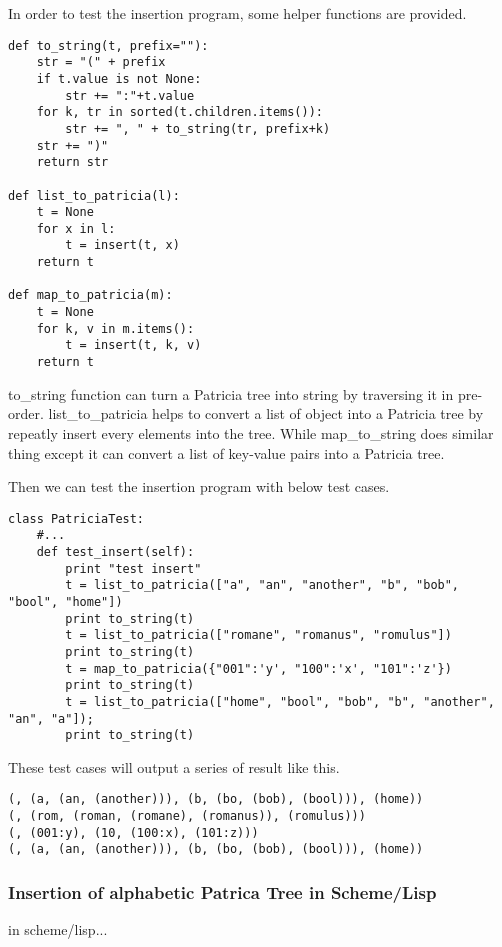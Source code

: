 \documentclass{article}
\begin{document}
In order to test the insertion program, some helper functions are
provided.

\begin{lstlisting}
def to_string(t, prefix=""):
    str = "(" + prefix
    if t.value is not None:
        str += ":"+t.value
    for k, tr in sorted(t.children.items()):
        str += ", " + to_string(tr, prefix+k)
    str += ")"
    return str

def list_to_patricia(l):
    t = None
    for x in l:
        t = insert(t, x)
    return t

def map_to_patricia(m):
    t = None
    for k, v in m.items():
        t = insert(t, k, v)
    return t
\end{lstlisting}

to\_string function can turn a Patricia tree into string by traversing it
in pre-order. list\_to\_patricia helps to convert a list of object into
a Patricia tree by repeatly insert every elements into the tree. While 
map\_to\_string does similar thing except it can convert a list of key-value
pairs into a Patricia tree.

Then we can test the insertion program with below test cases.

\begin{lstlisting}
class PatriciaTest:
    #...
    def test_insert(self):
        print "test insert"
        t = list_to_patricia(["a", "an", "another", "b", "bob", "bool", "home"])
        print to_string(t)
        t = list_to_patricia(["romane", "romanus", "romulus"])
        print to_string(t)
        t = map_to_patricia({"001":'y', "100":'x', "101":'z'})
        print to_string(t)
        t = list_to_patricia(["home", "bool", "bob", "b", "another", "an", "a"]);
        print to_string(t)
\end{lstlisting}

These test cases will output a series of result like this.

\begin{verbatim}
(, (a, (an, (another))), (b, (bo, (bob), (bool))), (home))
(, (rom, (roman, (romane), (romanus)), (romulus)))
(, (001:y), (10, (100:x), (101:z)))
(, (a, (an, (another))), (b, (bo, (bob), (bool))), (home))
\end{verbatim}

\subsubsection*{Insertion of alphabetic Patrica Tree in Scheme/Lisp}
in scheme/lisp...
\end{document}
